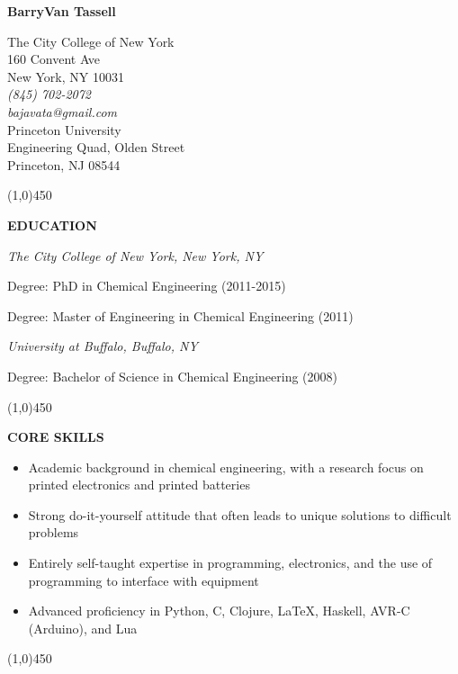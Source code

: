 \documentclass[9pt,letterpaper]{article}
\begin{document}
\begin{center}
  {\LARGE \textbf{BarryVan Tassell}}\\
  \begin{multicols}{3}
    {\small The City College of New York \\
    160 Convent Ave \\
  New York, NY 10031}\\
  \columnbreak
  \emph{\small (845) 702-2072\\
    bajavata@gmail.com}\\
  \columnbreak
    {\small Princeton University \\
    Engineering Quad, Olden Street \\
    Princeton, NJ 08544}
  \end{multicols}
  \line(1,0){450}
\end{center}

\onehalfspacing

{\singlespacing
\noindent \textbf{EDUCATION}
\newline
}
{\small
\indent \emph{The City College of New York, New York, NY}

\indent \indent Degree: PhD in Chemical Engineering (2011-2015)

\indent \indent Degree: Master of Engineering in Chemical Engineering (2011)

\indent \emph{University at Buffalo, Buffalo, NY}

\indent \indent Degree: Bachelor of Science in Chemical Engineering (2008)
\begin{center}
  \line(1,0){450}
\end{center}
}

{\singlespacing
\noindent \textbf{CORE SKILLS}

{\small\begin{itemize}
\item Academic background in chemical engineering, with a research focus on printed electronics and printed batteries
\item Strong do-it-yourself attitude that often leads to unique solutions to difficult problems
\item Entirely self-taught expertise in programming, electronics, and the use of programming to interface with equipment
\item Advanced proficiency in Python, C, Clojure, \LaTeX, Haskell, AVR-C (Arduino), and Lua
\end{itemize}}}

\begin{center}
  \line(1,0){450}
\end{center}
\end{document}
